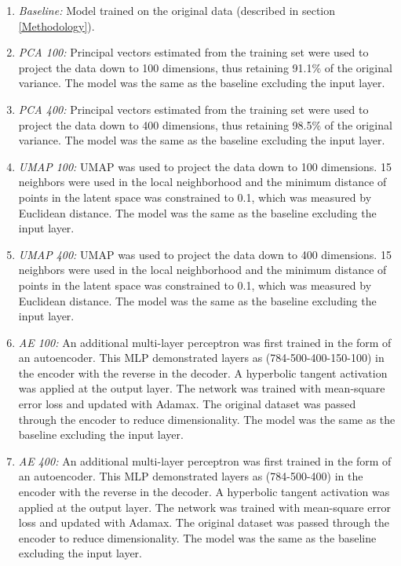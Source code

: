 \documentclass[conference]{IEEEtran}
\begin{document}
\begin{enumerate}
	\item \textit{Baseline:} Model trained on the original data (described in section \ref{Methodology}).
	\item \textit{PCA 100:} Principal vectors estimated from the training set were used to project the data down to 100 dimensions, thus retaining 91.1$\%$ of the original variance.  The model was the same as the baseline excluding the input layer.
	\item \textit{PCA 400:} Principal vectors estimated from the training set were used to project the data down to 400 dimensions, thus retaining 98.5$\%$ of the original variance.  The model was the same as the baseline excluding the input layer.
	\item \textit{UMAP 100:} UMAP was used to project the data down to 100 dimensions.  15 neighbors were used in the local neighborhood and the minimum distance of points in the latent space was constrained to 0.1, which was measured by Euclidean distance.  The model was the same as the baseline excluding the input layer.
	\item \textit{UMAP 400:} UMAP was used to project the data down to 400 dimensions.  15 neighbors were used in the local neighborhood and the minimum distance of points in the latent space was constrained to 0.1, which was measured by Euclidean distance.  The model was the same as the baseline excluding the input layer.
	\item \textit{AE 100:} An additional multi-layer perceptron was first trained in the form of an autoencoder.  This MLP demonstrated layers as (784-500-400-150-100) in the encoder with the reverse in the decoder.  A hyperbolic tangent activation was applied at the output layer.  The network was trained with mean-square error loss and updated with Adamax. The original dataset was passed through the encoder to reduce dimensionality. The model was the same as the baseline excluding the input layer.
	\item \textit{AE 400:}  An additional multi-layer perceptron was first trained in the form of an autoencoder.  This MLP demonstrated layers as (784-500-400) in the encoder with the reverse in the decoder.  A hyperbolic tangent activation was applied at the output layer.  The network was trained with mean-square error loss and updated with Adamax. The original dataset was passed through the encoder to reduce dimensionality. The model was the same as the baseline excluding the input layer.
\end{enumerate}
\end{document}
